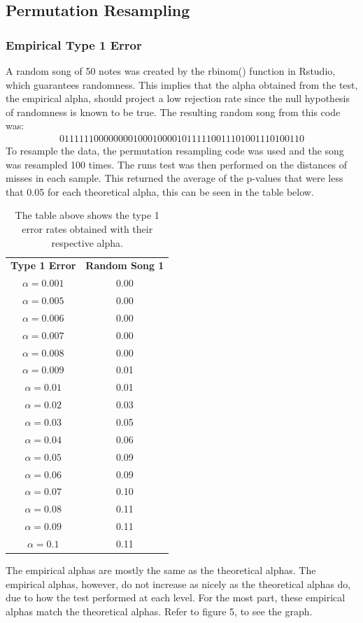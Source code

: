 \documentclass[12pt, letterpaper]{article}
\begin{document}
\subsection{Permutation Resampling}
\subsubsection{Empirical Type 1 Error} 
A random song of 50 notes was created by the rbinom() function in Rstudio, which guarantees randomness. This implies that the alpha obtained from the test, the empirical alpha, should project a low rejection rate since the null hypothesis of randomness is known to be true. The resulting random song from this code was:
\begin{gather*}
  0 1 1 1 1 1 1 0 0 0 0 0 0 0 0 1 0 0 0 1 0 
  0 0 0 1 0 1 1 1 1 1 0 0 1 1 1 0 1 0 0 1 1
  1 0 1 0 0 1 1 0
\end{gather*} 
To resample the data, the permutation resampling code was used and the song was resampled 100 times. The runs test was then performed on the distances of misses in each sample. This returned the average of the p-values that were less that 0.05 for each theoretical alpha, this can be seen in the table below.
\begin{table}[h]
\begin{center}
\begin{tabular}{|c|c|}
\textbf{Type 1 Error} & \textbf{Random Song 1}\\
$\alpha = 0.001$ & 0.00\\
$\alpha = 0.005$ &  0.00\\
$\alpha = 0.006$ &  0.00\\
$\alpha = 0.007$ & 0.00\\
$\alpha = 0.008$ & 0.00\\
$\alpha = 0.009$ & 0.01\\
$\alpha = 0.01$ & 0.01\\
$\alpha = 0.02$ & 0.03\\
$\alpha = 0.03$ & 0.05\\
$\alpha = 0.04$ & 0.06\\
$\alpha = 0.05$ &  0.09\\
$\alpha = 0.06$ &  0.09\\
$\alpha = 0.07$ &  0.10\\
$\alpha = 0.08$ &  0.11\\
$\alpha = 0.09$ & 0.11\\
$\alpha = 0.1$ & 0.11 \\
\end{tabular}
\end{center}
\caption{The table above shows the type 1 error rates obtained with their respective alpha.}
\label{fig: Type 1 Error Rates for Permutation Resampling}
\end{table}
The empirical alphas are mostly the same as the theoretical alphas. The empirical alphas, however, do not increase as nicely as the theoretical alphas do, due to how the test performed at each level. For the most part, these empirical alphas match the theoretical alphas. Refer to figure 5, to see the graph.
\end{document}
